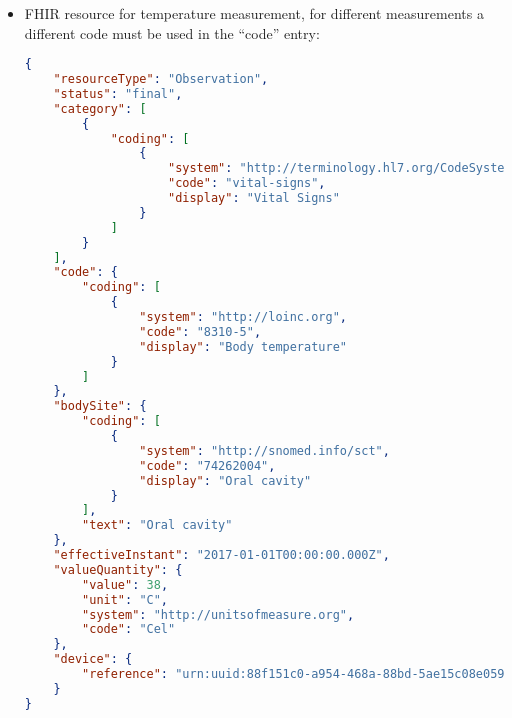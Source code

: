 \begin{itemize}
    \item \acs{FHIR} resource for temperature measurement, for different measurements a different code must be used in the ``code'' entry:
    \begin{lstlisting}[language=json] 
{ 
    "resourceType": "Observation", 
    "status": "final", 
    "category": [ 
        { 
            "coding": [ 
                { 
                    "system": "http://terminology.hl7.org/CodeSystem/observation-category", 
                    "code": "vital-signs", 
                    "display": "Vital Signs" 
                } 
            ] 
        } 
    ], 
    "code": { 
        "coding": [ 
            { 
                "system": "http://loinc.org", 
                "code": "8310-5", 
                "display": "Body temperature" 
            } 
        ] 
    }, 
    "bodySite": { 
        "coding": [ 
            { 
                "system": "http://snomed.info/sct", 
                "code": "74262004", 
                "display": "Oral cavity" 
            } 
        ], 
        "text": "Oral cavity" 
    }, 
    "effectiveInstant": "2017-01-01T00:00:00.000Z", 
    "valueQuantity": { 
        "value": 38, 
        "unit": "C", 
        "system": "http://unitsofmeasure.org", 
        "code": "Cel" 
    }, 
    "device": { 
        "reference": "urn:uuid:88f151c0-a954-468a-88bd-5ae15c08e059" 
    } 
}  
    \end{lstlisting}


\end{itemize}
